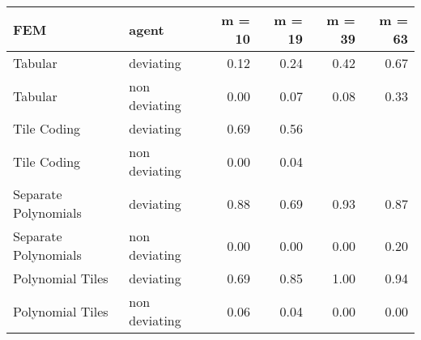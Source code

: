 \begin{tabular}{llrrrr}
  \hline
FEM & agent & m = 10 & m = 19 & m = 39 & m = 63 \\ 
  \hline
Tabular & deviating & 0.12 & 0.24 & 0.42 & 0.67 \\ 
  Tabular & non deviating & 0.00 & 0.07 & 0.08 & 0.33 \\ 
  Tile Coding & deviating & 0.69 & 0.56 &  &  \\ 
  Tile Coding & non deviating & 0.00 & 0.04 &  &  \\ 
  Separate Polynomials & deviating & 0.88 & 0.69 & 0.93 & 0.87 \\ 
  Separate Polynomials & non deviating & 0.00 & 0.00 & 0.00 & 0.20 \\ 
  Polynomial Tiles & deviating & 0.69 & 0.85 & 1.00 & 0.94 \\ 
  Polynomial Tiles & non deviating & 0.06 & 0.04 & 0.00 & 0.00 \\ 
   \hline
\end{tabular}
